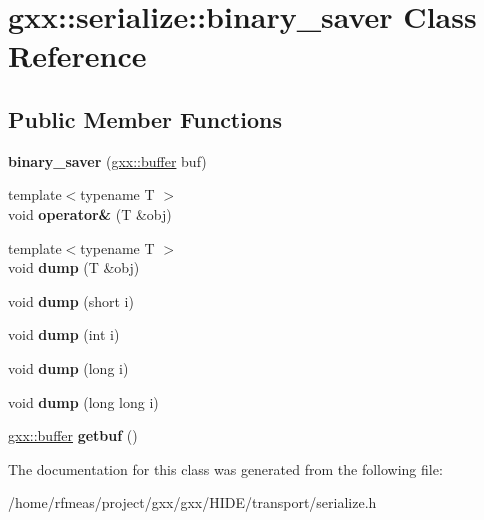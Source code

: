 \hypertarget{classgxx_1_1serialize_1_1binary__saver}{}\section{gxx\+:\+:serialize\+:\+:binary\+\_\+saver Class Reference}
\label{classgxx_1_1serialize_1_1binary__saver}
\subsection*{Public Member Functions}
\begin{DoxyCompactItemize}
\item 
{\bfseries binary\+\_\+saver} (\hyperlink{classgxx_1_1buffer}{gxx\+::buffer} buf)\hypertarget{classgxx_1_1serialize_1_1binary__saver_a4bca01b1beea967c98d8653a7fd49125}{}\label{classgxx_1_1serialize_1_1binary__saver_a4bca01b1beea967c98d8653a7fd49125}

\item 
{\footnotesize template$<$typename T $>$ }\\void {\bfseries operator\&} (T \&obj)\hypertarget{classgxx_1_1serialize_1_1binary__saver_abb39ead1609adaf314204114bfc31431}{}\label{classgxx_1_1serialize_1_1binary__saver_abb39ead1609adaf314204114bfc31431}

\item 
{\footnotesize template$<$typename T $>$ }\\void {\bfseries dump} (T \&obj)\hypertarget{classgxx_1_1serialize_1_1binary__saver_ac3feded47f584f858c15fcf3a61277ca}{}\label{classgxx_1_1serialize_1_1binary__saver_ac3feded47f584f858c15fcf3a61277ca}

\item 
void {\bfseries dump} (short i)\hypertarget{classgxx_1_1serialize_1_1binary__saver_a86018a16014db77e82f13bc2dd698ecb}{}\label{classgxx_1_1serialize_1_1binary__saver_a86018a16014db77e82f13bc2dd698ecb}

\item 
void {\bfseries dump} (int i)\hypertarget{classgxx_1_1serialize_1_1binary__saver_a088c428ea3dcbc5642df17700b4437e2}{}\label{classgxx_1_1serialize_1_1binary__saver_a088c428ea3dcbc5642df17700b4437e2}

\item 
void {\bfseries dump} (long i)\hypertarget{classgxx_1_1serialize_1_1binary__saver_a56cefadc087e509e1a2bd89411f5c360}{}\label{classgxx_1_1serialize_1_1binary__saver_a56cefadc087e509e1a2bd89411f5c360}

\item 
void {\bfseries dump} (long long i)\hypertarget{classgxx_1_1serialize_1_1binary__saver_a1bbe03087c55aee7a535a4f0d6cfddc2}{}\label{classgxx_1_1serialize_1_1binary__saver_a1bbe03087c55aee7a535a4f0d6cfddc2}

\item 
\hyperlink{classgxx_1_1buffer}{gxx\+::buffer} {\bfseries getbuf} ()\hypertarget{classgxx_1_1serialize_1_1binary__saver_ac06cff44e0b6e33abebeccae82d938ef}{}\label{classgxx_1_1serialize_1_1binary__saver_ac06cff44e0b6e33abebeccae82d938ef}

\end{DoxyCompactItemize}


The documentation for this class was generated from the following file\+:\begin{DoxyCompactItemize}
\item 
/home/rfmeas/project/gxx/gxx/\+H\+I\+D\+E/transport/serialize.\+h\end{DoxyCompactItemize}
